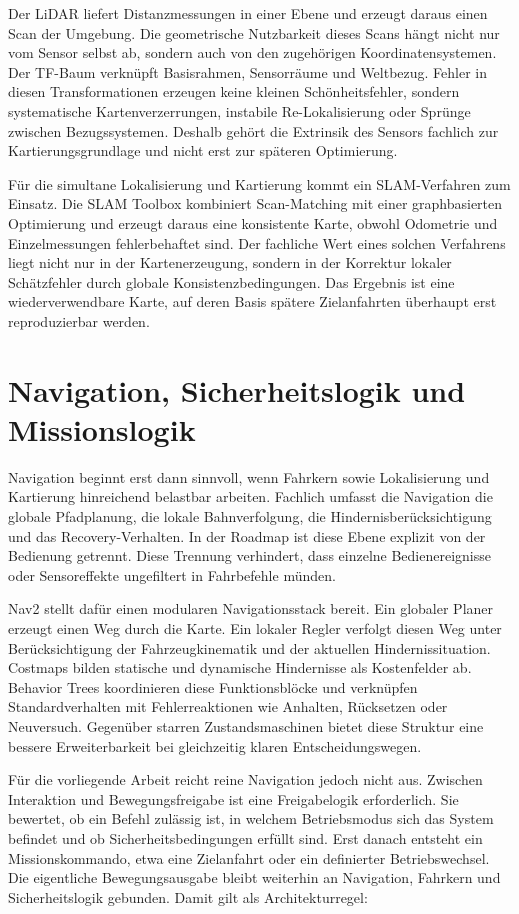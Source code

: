 Der LiDAR liefert Distanzmessungen in einer Ebene und erzeugt daraus einen Scan der Umgebung. Die geometrische Nutzbarkeit dieses Scans hängt nicht nur vom Sensor selbst ab, sondern auch von den zugehörigen Koordinatensystemen. Der TF-Baum verknüpft Basisrahmen, Sensorräume und Weltbezug. Fehler in diesen Transformationen erzeugen keine kleinen Schönheitsfehler, sondern systematische Kartenverzerrungen, instabile Re-Lokalisierung oder Sprünge zwischen Bezugssystemen. Deshalb gehört die Extrinsik des Sensors fachlich zur Kartierungsgrundlage und nicht erst zur späteren Optimierung.

Für die simultane Lokalisierung und Kartierung kommt ein SLAM-Verfahren zum Einsatz. Die SLAM Toolbox kombiniert Scan-Matching mit einer graphbasierten Optimierung und erzeugt daraus eine konsistente Karte, obwohl Odometrie und Einzelmessungen fehlerbehaftet sind. Der fachliche Wert eines solchen Verfahrens liegt nicht nur in der Kartenerzeugung, sondern in der Korrektur lokaler Schätzfehler durch globale Konsistenzbedingungen. Das Ergebnis ist eine wiederverwendbare Karte, auf deren Basis spätere Zielanfahrten überhaupt erst reproduzierbar werden.

\section{Navigation, Sicherheitslogik und Missionslogik}

Navigation beginnt erst dann sinnvoll, wenn Fahrkern sowie Lokalisierung und Kartierung hinreichend belastbar arbeiten. Fachlich umfasst die Navigation die globale Pfadplanung, die lokale Bahnverfolgung, die Hindernisberücksichtigung und das Recovery-Verhalten. In der Roadmap ist diese Ebene explizit von der Bedienung getrennt. Diese Trennung verhindert, dass einzelne Bedienereignisse oder Sensoreffekte ungefiltert in Fahrbefehle münden.

Nav2 stellt dafür einen modularen Navigationsstack bereit. Ein globaler Planer erzeugt einen Weg durch die Karte. Ein lokaler Regler verfolgt diesen Weg unter Berücksichtigung der Fahrzeugkinematik und der aktuellen Hindernissituation. Costmaps bilden statische und dynamische Hindernisse als Kostenfelder ab. Behavior Trees koordinieren diese Funktionsblöcke und verknüpfen Standardverhalten mit Fehlerreaktionen wie Anhalten, Rücksetzen oder Neuversuch. Gegenüber starren Zustandsmaschinen bietet diese Struktur eine bessere Erweiterbarkeit bei gleichzeitig klaren Entscheidungswegen.

Für die vorliegende Arbeit reicht reine Navigation jedoch nicht aus. Zwischen Interaktion und Bewegungsfreigabe ist eine Freigabelogik erforderlich. Sie bewertet, ob ein Befehl zulässig ist, in welchem Betriebsmodus sich das System befindet und ob Sicherheitsbedingungen erfüllt sind. Erst danach entsteht ein Missionskommando, etwa eine Zielanfahrt oder ein definierter Betriebswechsel. Die eigentliche Bewegungsausgabe bleibt weiterhin an Navigation, Fahrkern und Sicherheitslogik gebunden. Damit gilt als Architekturregel:

